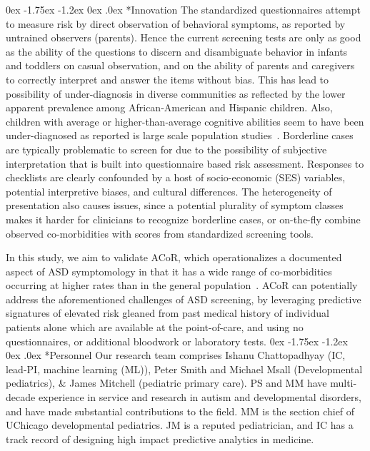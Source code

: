 \documentclass[onecolumn, compsoc,11pt]{IEEEtran}
\makeatletter
\renewcommand\subsection{\@startsection {subsection}{2}{\z@}%
                                   {0ex \@plus -1.75ex \@minus -1.2ex}%
                                   {0ex \@plus.0ex}%
                                   {\fontsize{11}{11}\selectfont\bfseries\sffamily\color{black}}}
\def\acor{ACoR\xspace}
\makeatother
\begin{document}
\subsection*{Innovation}
The standardized questionnaires attempt to measure risk by direct observation of behavioral symptoms, as reported by untrained observers (parents). Hence the current screening  tests are only as good as the ability of the questions to discern and disambiguate behavior in infants and toddlers on casual observation, and on the ability of parents and caregivers to correctly interpret and answer the items without bias.
This has lead to possibility of  under-diagnosis in diverse communities as reflected by the
lower apparent prevalence among African-American and Hispanic children. Also, children with average or higher-than-average cognitive abilities seem to have been under-diagnosed as reported is large scale population studies~\cite{hyman2020identification}. Borderline cases are typically problematic to screen for due to the possibility  of subjective interpretation that is built into questionnaire based risk assessment. Responses to checklists are clearly confounded by a host of socio-economic (SES) variables, potential interpretive biases, and  cultural differences. The heterogeneity of presentation also causes issues, since a potential plurality of symptom classes makes it harder for clinicians  to recognize borderline cases, or on-the-fly combine observed co-morbidities with scores from  standardized screening tools. 

In this study, we aim to validate \acor, which operationalizes a documented aspect of ASD symptomology in  that it has   a wide range  of co-morbidities occurring at  higher rates than in the general population~\cite{hyman2020identification}.
\acor  can potentially address the aforementioned   challenges of ASD screening, by leveraging predictive signatures of  elevated risk gleaned from past medical history of individual  patients alone which are available at the point-of-care, and using no questionnaires, or additional bloodwork or laboratory tests.
\subsection*{Personnel}
{\color{Red1} Our research team comprises Ishanu Chattopadhyay (IC, lead-PI, machine learning (ML)), Peter Smith and  Michael Msall (Developmental pediatrics), \&  James Mitchell (pediatric primary care). PS and MM have multi-decade experience in service and research in autism and developmental disorders, and have made substantial contributions to the field. MM is the section chief of UChicago developmental pediatrics. JM is a reputed pediatrician, and IC has a track record of designing high impact predictive analytics in medicine.}
\clearpage
\end{document}
